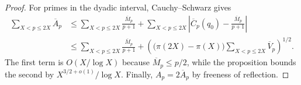 \begin{proof}
For primes in the dyadic interval, Cauchy--Schwarz gives
\[
 \begin{split}
 \sum_{X<p\le2X}\overline A_p
 &\le
 \sum_{X<p\le2X}\frac{\overline M_p}{p+1}
 +\sum_{X<p\le2X}
  \left|\overline C_p(q_0)-\frac{\overline M_p}{p+1}\right| \\
 &\le
 \sum_{X<p\le2X}\frac{\overline M_p}{p+1}
 +\left(
   \bigl(\pi(2X)-\pi(X)\bigr)
   \sum_{X<p\le2X}\overline V_p
  \right)^{1/2}.
 \end{split}
\]
The first term is $O(X/\log X)$ because
$\overline M_p\le p/2$, while the proposition bounds the second by
$X^{3/2+o(1)}/\log X$.  Finally, $A_p=2\overline A_p$ by freeness of
reflection.
\end{proof}
